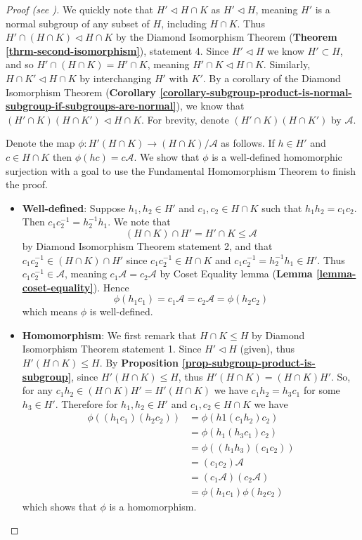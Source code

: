 \begin{proof}[Proof (see {\cite[p.~110]{hungerford_1980}})]
    We quickly note that $H' \lhd H \cap K$ as $H' \lhd H$, meaning $H'$ is a normal subgroup of any subset of $H$, including $H \cap K$. Thus $H' \cap (H \cap K) \lhd H \cap K$ by the Diamond Isomorphism Theorem (\textbf{Theorem \ref{thrm-second-isomorphism}}), statement 4. Since $H'\lhd H$ we know $H' \subset H$, and so $H' \cap (H \cap K) = H' \cap K$, meaning $H' \cap K \lhd H \cap K$. Similarly, $H \cap K' \lhd H \cap K$ by interchanging $H'$ with $K'$. By a corollary of the Diamond Isomorphism Theorem (\textbf{Corollary \ref{corollary-subgroup-product-is-normal-subgroup-if-subgroups-are-normal}}), we know that $(H' \cap K)(H \cap K') \lhd H \cap K$. For brevity, denote $(H' \cap K)(H \cap K')$ by $\mathcal{A}$.
    
    Denote the map $\phi: H'(H\cap K) \to (H\cap K)/\mathcal{A}$ as follows. If $h \in H'$ and $c \in H \cap K$ then $\phi(hc) = c\mathcal{A}$. We show that $\phi$ is a well-defined homomorphic surjection with a goal to use the Fundamental Homomorphism Theorem to finish the proof.
    
    \begin{itemize}
        \item \textbf{Well-defined}: Suppose $h_1, h_2 \in H'$ and $c_1, c_2 \in H \cap K$ such that $h_1h_2 = c_1c_2$. Then $c_1c_2^{-1} = h_2^{-1}h_1$. We note that
        \[
            (H \cap K) \cap H' = H' \cap K \leq \mathcal{A}    
        \]
        by Diamond Isomorphism Theorem statement 2, and that $c_1c_2^{-1} \in (H \cap K) \cap H'$ since $c_1c_2^{-1} \in H \cap K$ and $c_1c_2^{-1} = h_2^{-1}h_1 \in H'$. Thus $c_1c_2^{-1} \in \mathcal{A}$, meaning $c_1\mathcal{A} = c_2\mathcal{A}$ by Coset Equality lemma (\textbf{Lemma \ref{lemma-coset-equality}}). Hence
        \[
            \phi(h_1c_1) = c_1\mathcal{A} = c_2\mathcal{A} = \phi(h_2c_2)        
        \]
        which means $\phi$ is well-defined.
        
        \item \textbf{Homomorphism}: We first remark that $H \cap K \leq H$ by Diamond Isomorphism Theorem statement 1. Since $H' \lhd H$ (given), thus $H'(H\cap K) \leq H$. By \textbf{Proposition \ref{prop-subgroup-product-is-subgroup}}, since $H'(H\cap K) \leq H$, thus $H'(H\cap K) = (H\cap K)H'$. So, for any $c_1h_2 \in (H\cap K)H' = H'(H\cap K)$ we have $c_1h_2 = h_3c_1$ for some $h_3 \in H'$. Therefore for $h_1, h_2 \in H'$ and $c_1, c_2 \in H \cap K$ we have
        \begin{align*}
            \phi((h_1c_1)(h_2c_2)) &= \phi(h1(c_1h_2)c_2)\\
            &=\phi(h_1(h_3c_1)c_2)\\
            &=\phi((h_1h_3)(c_1c_2))\\
            &=(c_1c_2)\mathcal{A}\\
            &=(c_1\mathcal{A})(c_2\mathcal{A})\\
            &=\phi(h_1c_1)\phi(h_2c_2)
        \end{align*}
        which shows that $\phi$ is a homomorphism.
        

\end{itemize}
\end{proof}
